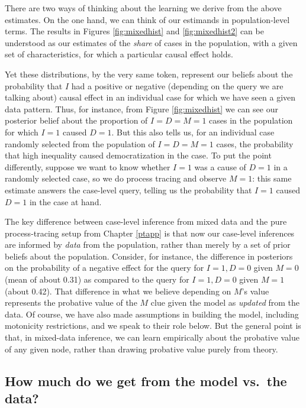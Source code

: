 \documentclass[
  12pt,
]{book}
\begin{document}
There are two ways of thinking about the learning we derive from the above estimates. On the one hand, we can think of our estimands in population-level terms. The results in Figures \ref{fig:mixedhist} and \ref{fig:mixedhist2} can be understood as our estimates of the \emph{share} of cases in the population, with a given set of characteristics, for which a particular causal effect holds.

Yet these distributions, by the very same token, represent our beliefs about the probability that \(I\) had a positive or negative (depending on the query we are talking about) causal effect in an individual case for which we have seen a given data pattern. Thus, for instance, from Figure \ref{fig:mixedhist} we can see our posterior belief about the proportion of \(I=D=M=1\) cases in the population for which \(I=1\) caused \(D=1\). But this also tells us, for an individual case randomly selected from the population of \(I=D=M=1\) cases, the probability that high inequality caused democratization in the case. To put the point differently, suppose we want to know whether \(I=1\) was a cause of \(D=1\) in a randomly selected case, so we do process tracing and observe \(M=1\): this same estimate answers the case-level query, telling us the probability that \(I=1\) caused \(D=1\) in the case at hand.

The key difference between case-level inference from mixed data and the pure process-tracing setup from Chapter \ref{ptapp} is that now our case-level inferences are informed by \emph{data} from the population, rather than merely by a set of prior beliefs about the population. Consider, for instance, the difference in posteriors on the probability of a negative effect for the query for \(I=1, D=0\) given \(M=0\) (mean of about 0.31) as compared to the query for \(I=1, D=0\) given \(M=1\) (about 0.42). That difference in what we believe depending on \(M\)'s value represents the probative value of the \(M\) clue given the model as \emph{updated} from the data. Of course, we have also made assumptions in building the model, including motonicity restrictions, and we speak to their role below. But the general point is that, in mixed-data inference, we can learn empirically about the probative value of any given node, rather than drawing probative value purely from theory.

\hypertarget{how-much-do-we-get-from-the-model-vs.-the-data}{%
\subsection{How much do we get from the model vs.~the data?}\label{how-much-do-we-get-from-the-model-vs.-the-data}}
\end{document}

